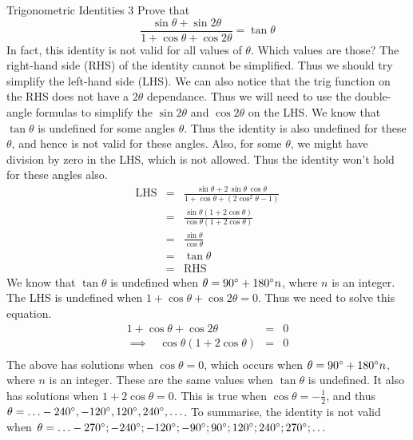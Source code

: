 \begin{wex}{Trigonometric Identities 3}
{Prove that $$\frac{\sin \theta+\sin  2\theta}{1+\cos\theta+\cos 2\theta}=\tan \theta$$
In fact, this identity is not valid for all values of $\theta$. Which values are those?}
{
The right-hand side (RHS) of the identity cannot be simplified. Thus we should try simplify the left-hand side (LHS). We can also notice that the trig function on the RHS does not have a $2\theta$ dependance. Thus we will need to use the double-angle formulas to simplify the $\sin 2\theta$ and $\cos 2\theta$ on the LHS. 
We know that $\tan\theta$ is undefined for some angles $\theta$. Thus the identity is also undefined for these $\theta$, and hence is not valid for these angles. Also, for some $\theta$, we might have division by zero in the LHS, which is not allowed. Thus the identity won't hold for these angles also.
\begin{eqnarray*}
\mbox{LHS}&=&\frac{\sin\theta+2\,\sin \theta\,\cos \theta}{1+\cos\theta +(2 \cos^2\theta-1)}\\
&=&\frac{\sin\theta(1+2 \cos\theta)}{\cos\theta(1+2\cos\theta)}\\
&=&\frac{\sin\theta}{\cos\theta}\\
&=&\tan\theta\\
&=&\mbox{RHS}
\end{eqnarray*}
We know that $\tan\theta$ is undefined when $\theta=90^{\circ}+180^{\circ} n$, where $n$ is an integer. 
The LHS is undefined when $1+\cos\theta+\cos 2\theta=0$. Thus we need to solve this equation.
\begin{eqnarray*}
1+\cos \theta+\cos 2\theta&=&0\\
\implies \ \ \ \ \cos \theta (1+2\cos\theta)&=&0\\
\end{eqnarray*}
The above has solutions when $\cos\theta=0$, which occurs when $\theta=90^{\circ}+180^{\circ} n$, where $n$ is an integer. These are the same values when $\tan\theta$ is undefined. It also has solutions when $1+2\cos\theta=0$. This is true when $\cos\theta=-\frac{1}{2}$, and thus $\theta=\ldots -240^{\circ}, -120^{\circ}, 120^{\circ}, 240^{\circ}, \ldots$. 
To summarise, the identity is not valid when $\theta=\ldots -270^{\circ}; -240^{\circ}; -120^{\circ}; -90^{\circ};90^{\circ}; 120^{\circ}; 240^{\circ}; 270^{\circ}; \ldots$
}
\end{wex}

